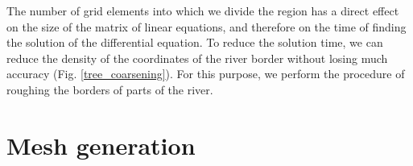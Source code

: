 \documentclass[]{pracamgr}
\begin{document}
      The number of grid elements into which we divide the region has a direct effect on the size of the matrix of linear equations, and therefore on the time of finding the solution of the differential equation. To reduce the solution time, we can reduce the density of the coordinates of the river border without losing much accuracy (Fig. \ref{tree_coarsening}). For this purpose, we perform the procedure of roughing the borders of parts of the river. 

    \section{Mesh generation}
\end{document}
